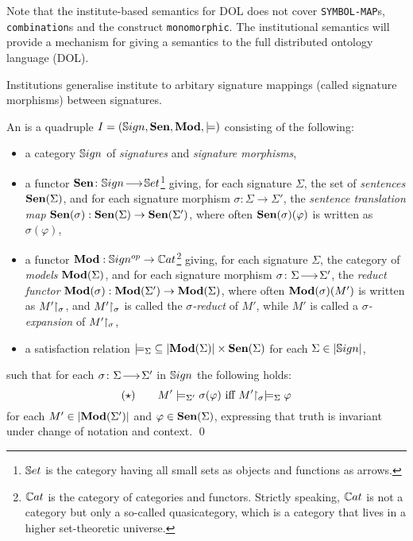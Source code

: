 \documentclass[%
\ifpretendfinal
final%
\else
draft%
\fi,
a4paper,
wd]{isov2}
\newcommand*{\syntax}[1]{\texttt{#1}}
\begin{document}
 \label{an:institution}

Note that the institute-based semantics for DOL does not cover
\syntax{SYMBOL-MAP}s, \syntax{combination}s and the construct \syntax{monomorphic}.  The institutional semantics will provide a mechanism for giving a semantics to the full distributed ontology language (DOL).


Institutions generalise institute to arbitary signature mappings
(called signature morphisms) between signatures.
\begin{definition}\label{def:inst} An
  is a quadruple $I=(\mathbb{S}ign,\mathbf {Sen},\mathbf{Mod},{\models})$
consisting of the following:
%
\begin{itemize}
\item a category $\mathbb{S}ign$ of \emph{signatures} and \emph{signature morphisms},
\item a functor $\mathbf {Sen}\colon\mathbb{S}ign\!\longrightarrow\!\mathbb{S}et$\footnote{$\mathbb{S}et$ is the
category having all small \textsc{}sets as objects and functions as
arrows.}  giving, for each signature $\Sigma$, the set of
\emph{sentences} $\mathbf {Sen}(\Sigma)$, and for each signature morphism
$\sigma:{\Sigma}\to{\Sigma'}$, the \emph{sentence translation map}
$\mathbf {Sen}(\sigma):{\mathbf {Sen}(\Sigma)}\to{\mathbf {Sen}(\Sigma')}$, where often
$\mathbf {Sen}(\sigma)(\varphi)$ is written as $\sigma(\varphi)$, \item a
functor $\mathbf{Mod}:{\mathbb{S}ign^{op}}\to{\mathbb{C}at}$\footnote {$\mathbb{C}at$ is the category
of categories and functors. Strictly speaking, $\mathbb{C}at$ is not a
category but only a so-called quasicategory, which is a category that
lives in a higher set-theoretic universe.} giving, for each signature
$\Sigma$, the category of \emph{models} $\mathbf{Mod}(\Sigma)$, and for each
signature morphism $\sigma\colon\Sigma\!\longrightarrow\!\Sigma'$, the \emph{reduct
functor\/} $\mathbf{Mod}(\sigma):{\mathbf{Mod}(\Sigma')}\to {\mathbf{Mod}(\Sigma)}$, where
often $\mathbf{Mod}(\sigma)(M')$ is written as $M'\hspace{-.3em}\upharpoonright_{\sigma}$, and
$M'\hspace{-.3em}\upharpoonright_{\sigma}$ is called the \emph{$\sigma$-reduct} of $M'$,
while $M'$ is called a \emph{$\sigma$-expansion} of
$M'\hspace{-.3em}\upharpoonright_{\sigma}$,
\item a satisfaction relation
${\models_{\Sigma}}\subseteq|{\mathbf{Mod}(\Sigma)|\times\mathbf {Sen}(\Sigma)}$ for
each $\Sigma\in |\mathbb{S}ign|$,
\end{itemize}
%
such that for each $\sigma\colon\Sigma\!\longrightarrow\!\Sigma'$ in $\mathbb{S}ign$ the
following  holds:
$$
(\star) \qquad M'\models_{\Sigma'}\sigma(\varphi) \mbox{ iff }
M'\hspace{-.3em}\upharpoonright_{\sigma} \models_{\Sigma} \varphi
$$
for each $M'\in |\mathbf{Mod}(\Sigma')|$ and $\varphi\in \mathbf {Sen}(\Sigma)$,
expressing that truth is invariant under change of notation and
context.  \qed
\end{definition}
\end{document}
